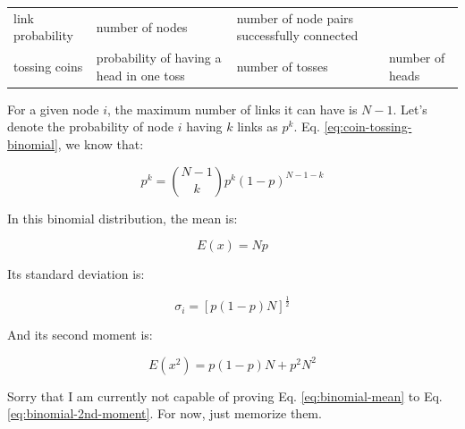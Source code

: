 \documentclass[
]{krantz}
\begin{document}
\begin{longtable}[]{@{}llll@{}}
\begin{minipage}[t]{0.32\columnwidth}
link probability\strut
\end{minipage} & \begin{minipage}[t]{0.14\columnwidth}\raggedright
number of nodes\strut
\end{minipage} & \begin{minipage}[t]{0.23\columnwidth}\raggedright
number of node pairs successfully connected\strut
\end{minipage}\tabularnewline
\begin{minipage}[t]{0.20\columnwidth}\raggedright
tossing coins\strut
\end{minipage} & \begin{minipage}[t]{0.32\columnwidth}\raggedright
probability of having a head in one toss\strut
\end{minipage} & \begin{minipage}[t]{0.14\columnwidth}\raggedright
number of tosses\strut
\end{minipage} & \begin{minipage}[t]{0.23\columnwidth}\raggedright
number of heads\strut
\end{minipage}\tabularnewline
\bottomrule
\end{longtable}

For a given node \(i\), the maximum number of links it can have is \(N-1\). Let's denote the probability of node \(i\) having \(k\) links as \(p^k\). Eq. \eqref{eq:coin-tossing-binomial}, we know that:

\begin{equation}
  p^k = {N-1 \choose k}p^k(1-p)^{N-1-k} \label{eq:random-network-binomial}
\end{equation}

In this binomial distribution, the mean is:

\begin{equation}
  E(x) = Np \label{eq:binomial-mean}
\end{equation}

Its standard deviation is:

\begin{equation}
  \sigma_i = [p(1-p)N]^\frac{1}{2} \label{eq:binomial-sd}
\end{equation}

And its second moment is:

\begin{equation}
  E(x^2) = p(1-p)N + p^2N^2 \label{eq:binomial-2nd-moment}
\end{equation}

Sorry that I am currently not capable of proving Eq. \eqref{eq:binomial-mean} to Eq. \eqref{eq:binomial-2nd-moment}. For now, just memorize them.
\end{document}
